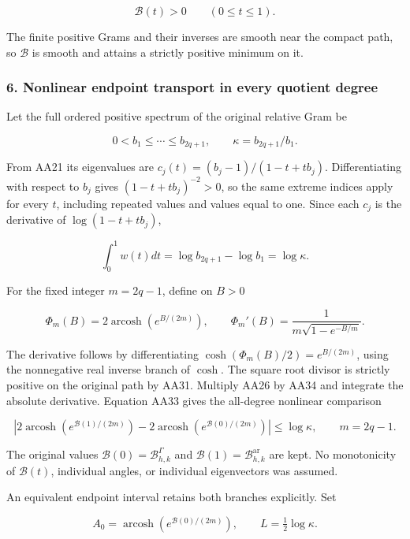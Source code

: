 \[
\mathcal B(t)>0\qquad(0\le t\le1).
\tag{AA31}
\]

The finite positive Grams and their inverses are smooth near the compact path, so \(\mathcal B\) is smooth and attains a strictly positive minimum on it.

\subsubsection{6. Nonlinear endpoint transport in every quotient degree}\label{endpoint-all_degree_angle_review--nonlinear-endpoint-transport-in-every-quotient-degree}

Let the full ordered positive spectrum of the original relative Gram be

\[
0<b_1\le\cdots\le b_{2q+1},\qquad
\kappa=b_{2q+1}/b_1.
\tag{AA32}
\]

From AA21 its eigenvalues are \(c_j(t)=(b_j-1)/(1-t+tb_j)\). Differentiating with respect to \(b_j\) gives \((1-t+tb_j)^{-2}>0\), so the same extreme indices apply for every \(t\), including repeated values and values equal to one. Since each \(c_j\) is the derivative of \(\log(1-t+tb_j)\),

\[
\int_0^1 w(t)dt=\log b_{2q+1}-\log b_1=\log\kappa.
\tag{AA33}
\]

For the fixed integer \(m=2q-1\), define on \(B>0\)

\[
\Phi_m(B)=2\operatorname{arcosh}(e^{B/(2m)}),\qquad
\Phi_m'(B)=\frac1{m\sqrt{1-e^{-B/m}}}.
\tag{AA34}
\]

The derivative follows by differentiating \(\cosh(\Phi_m(B)/2)=e^{B/(2m)}\), using the nonnegative real inverse branch of \(\cosh\). The square root divisor is strictly positive on the original path by AA31. Multiply AA26 by AA34 and integrate the absolute derivative. Equation AA33 gives the all-degree nonlinear comparison

\[
\boxed{
\left|2\operatorname{arcosh}(e^{\mathcal B(1)/(2m)})
      -2\operatorname{arcosh}(e^{\mathcal B(0)/(2m)})\right|
\le\log\kappa,
\qquad m=2q-1.
}
\tag{AA35}
\]

The original values \(\mathcal B(0)=\mathcal B^{\Gamma}_{h,k}\) and \(\mathcal B(1)=\mathcal B^{\mathrm{ar}}_{h,k}\) are kept. No monotonicity of \(\mathcal B(t)\), individual angles, or individual eigenvectors was assumed.

An equivalent endpoint interval retains both branches explicitly. Set

\[
A_0=\operatorname{arcosh}(e^{\mathcal B(0)/(2m)}),\qquad
L=\tfrac12\log\kappa.
\tag{AA36}
\]


